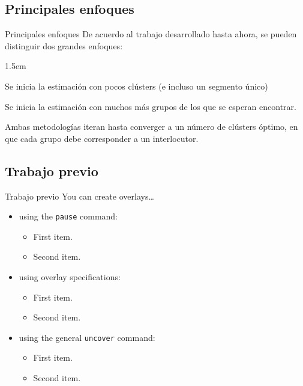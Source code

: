 \subsection{Principales enfoques}
\begin{frame}{Principales enfoques}
  De acuerdo al trabajo desarrollado hasta ahora, se pueden distinguir dos grandes enfoques:
  
  \begin{description}
    \itemsep1.5em
    \item[\textit{Bottom-up:}]
      Se inicia la estimación con pocos clústers (e incluso un segmento único)
    \item[\textit{Top-down:}]
      Se inicia la estimación con muchos más grupos de los que se esperan encontrar.
  \end{description}

   Ambas metodologías iteran hasta converger a un número de clústers óptimo, en que cada grupo debe corresponder a un interlocutor.
\end{frame}    

\subsection{Trabajo previo}
\begin{frame}{Trabajo previo}
  You can create overlays\dots
  \begin{itemize}
  \item using the \texttt{pause} command:
    \begin{itemize}
    \item
      First item.
    \item    
      Second item.
    \end{itemize}
  \item
    using overlay specifications:
    \begin{itemize}
    \item
      First item.
    \item
      Second item.
    \end{itemize}
  \item
    using the general \texttt{uncover} command:
    \begin{itemize}
      \item
        First item.
      \item
        Second item.
    \end{itemize}
  \end{itemize}
\end{frame}